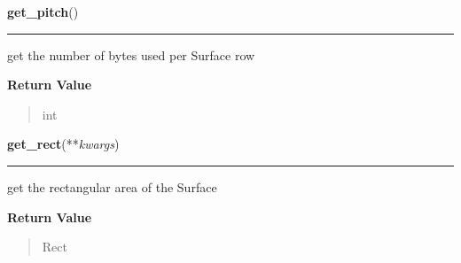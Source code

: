 \hspace{.8\funcindent}\begin{boxedminipage}{\funcwidth}

    \raggedright \textbf{get\_pitch}()

    \vspace{-1.5ex}

    \rule{\textwidth}{0.5\fboxrule}
\setlength{\parskip}{2ex}
    get the number of bytes used per Surface row

\setlength{\parskip}{1ex}
      \textbf{Return Value}
    \vspace{-1ex}

      \begin{quote}
      int

      \end{quote}

    \end{boxedminipage}

    \label{pygame:Surface:get_rect}

    \vspace{0.5ex}

\hspace{.8\funcindent}\begin{boxedminipage}{\funcwidth}

    \raggedright \textbf{get\_rect}(**\textit{kwargs})

    \vspace{-1.5ex}

    \rule{\textwidth}{0.5\fboxrule}
\setlength{\parskip}{2ex}
    get the rectangular area of the Surface

\setlength{\parskip}{1ex}
      \textbf{Return Value}
    \vspace{-1ex}

      \begin{quote}
      Rect

      \end{quote}

    \end{boxedminipage}

    \label{pygame:Surface:get_shifts}

    \vspace{0.5ex}

